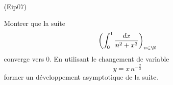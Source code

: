 \begin{tiny}(Eip07)\end{tiny}
Montrer que la suite
\begin{displaymath}
  \left( \int_0^1\frac{dx}{n^2+x^3}\right)_{n\in\N}
\end{displaymath}
converge vers $0$. En utilisant le changement de variable 
\begin{displaymath}
y=x\,n^{-\frac{2}{3}}  
\end{displaymath}
former un développement asymptotique de la suite.